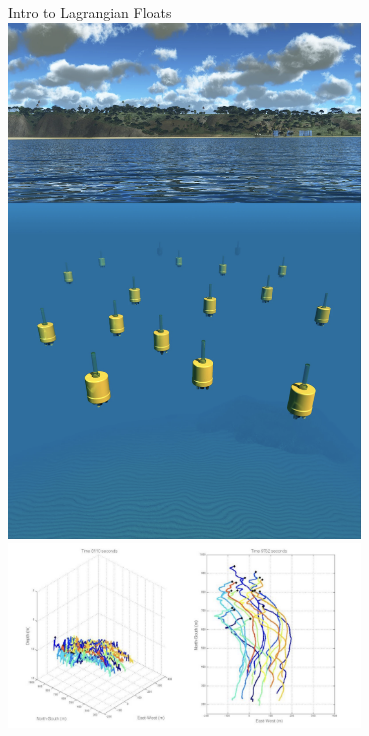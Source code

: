 \begin{frame}{Intro to Lagrangian Floats}
     \centering
     \includegraphics[height=0.7\textheight,width=0.7\textwidth,keepaspectratio]{images/VOLT/m-aue-swarm-render.png}
     \includegraphics[height=0.7\textheight,width=0.7\textwidth,keepaspectratio]{images/VOLT/volt-m-aue-swarm.png}
\end{frame}

